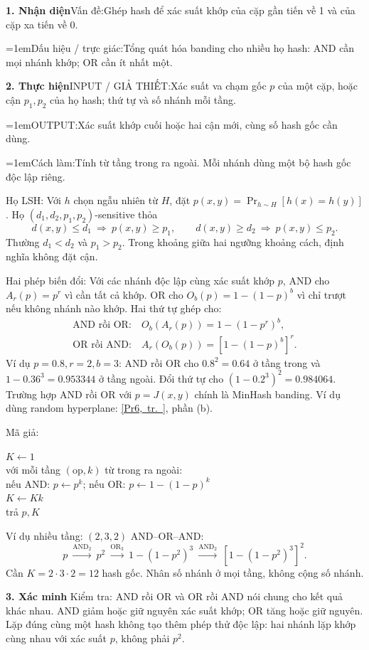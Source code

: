 \documentclass[10pt,a4paper,twocolumn]{article}
\makeatletter
\newcommand{\key}[1]{#1:\enspace}
\newcommand{\qlink}[2]{\hyperref[question:#1]{#2}}
\newcommand{\shareddataref}[1]{%
  \qlink{#1}{\mbox{[#1, tr.~\pageref*{question:#1}]}}}
\newcommand{\algfield}[2]{\par\noindent\hangindent=1em\relax#1:\enspace#2}
\newcommand{\unitheading}[2]{%
  \par\addvspace{1pt}\noindent\textbf{#1. #2}\enspace}
\newcommand{\unitverification}{\unitheading{3}{Xác minh}}
\newcommand{\unitfield}[4]{%
  \par\noindent\textbf{#1. #2}\enspace #3:\enspace #4}
\newcommand{\algsummary}[6]{%
  \begingroup\setlength{\parskip}{1pt}%
  \unitfield{1}{Nhận diện}{Vấn đề}{#1}%
  \algfield{Dấu hiệu / trực giác}{#2}%
  \if\relax\detokenize{#3}\relax\else\par\noindent#3\par\fi%
  \unitfield{2}{Thực hiện}{INPUT / GIẢ THIẾT}{#4}%
  \algfield{OUTPUT}{#5}%
  \algfield{Cách làm}{#6}\par\endgroup}
\newenvironment{algpseudo}{%
  \par\addvspace{2pt}\noindent
  \setlength{\parskip}{0pt}%
  Mã giả:\par\nobreak
  \begin{list}{}{\setlength{\leftmargin}{1em}\setlength{\topsep}{0pt}%
    \setlength{\partopsep}{0pt}\setlength{\parsep}{0pt}%
    \@beginparpenalty=10000\relax}%
  \item\relax
}{\end{list}\par\addvspace{3pt}}
\makeatother
\begin{document}
\algsummary{Ghép hash để xác suất khớp của cặp gần tiến về 1 và của cặp xa tiến về 0.}{Tổng quát hóa banding cho nhiều họ hash: AND cần mọi nhánh khớp; OR cần ít nhất một.}{}{Xác suất va chạm gốc $p$ của một cặp, hoặc cận $p_1,p_2$ của họ hash; thứ tự và số nhánh mỗi tầng.}{Xác suất khớp cuối hoặc hai cận mới, cùng số hash gốc cần dùng.}{Tính từ tầng trong ra ngoài. Mỗi nhánh dùng một bộ hash gốc độc lập riêng.}

\key{Họ LSH} Với $h$ chọn ngẫu nhiên từ $H$, đặt $p(x,y)=\Pr_{h\sim H}[h(x)=h(y)]$. Họ $(d_1,d_2,p_1,p_2)$-sensitive thỏa
\[
d(x,y)\le d_1\ \Rightarrow\ p(x,y)\ge p_1,\qquad
d(x,y)\ge d_2\ \Rightarrow\ p(x,y)\le p_2.
\]
Thường $d_1<d_2$ và $p_1>p_2$. Trong khoảng giữa hai ngưỡng khoảng cách, định nghĩa không đặt cận.

\key{Hai phép biến đổi} Với các nhánh độc lập cùng xác suất khớp $p$, AND cho $A_r(p)=p^r$ vì cần tất cả khớp. OR cho $O_b(p)=1-(1-p)^b$ vì chỉ trượt nếu không nhánh nào khớp. Hai thứ tự ghép cho:
\[
\begin{aligned}
\text{AND rồi OR:}\ &O_b(A_r(p))=1-(1-p^r)^b,\\
\text{OR rồi AND:}\ &A_r(O_b(p))=[1-(1-p)^b]^r.
\end{aligned}
\]
Ví dụ $p=0.8,r=2,b=3$: AND rồi OR cho $0.8^2=0.64$ ở tầng trong và $1-0.36^3=0.953344$ ở tầng ngoài. Đổi thứ tự cho $(1-0.2^3)^2=0.984064$. Trường hợp AND rồi OR với $p=J(x,y)$ chính là MinHash banding. Ví dụ dùng random hyperplane: \shareddataref{Pr6}, phần (b).

\begin{algpseudo}
$K\gets1$\\
với mỗi tầng $(\mathrm{op},k)$ từ trong ra ngoài:\\
\quad nếu AND: $p\gets p^k$; nếu OR: $p\gets1-(1-p)^k$\\
\quad $K\gets Kk$\\
trả $p,K$
\end{algpseudo}

\key{Ví dụ nhiều tầng} $(2,3,2)$ AND--OR--AND:
\[
p\ \xrightarrow{\mathrm{AND}_2}\ p^2\ \xrightarrow{\mathrm{OR}_3}\ 1-(1-p^2)^3
\ \xrightarrow{\mathrm{AND}_2}\ [1-(1-p^2)^3]^2.
\]
Cần $K=2\cdot3\cdot2=12$ hash gốc. Nhân số nhánh ở mọi tầng, không cộng số nhánh.

\unitverification
\key{Kiểm tra} AND rồi OR và OR rồi AND nói chung cho kết quả khác nhau. AND giảm hoặc giữ nguyên xác suất khớp; OR tăng hoặc giữ nguyên. Lặp đúng cùng một hash không tạo thêm phép thử độc lập: hai nhánh lặp khớp cùng nhau với xác suất $p$, không phải $p^2$.
\end{document}
